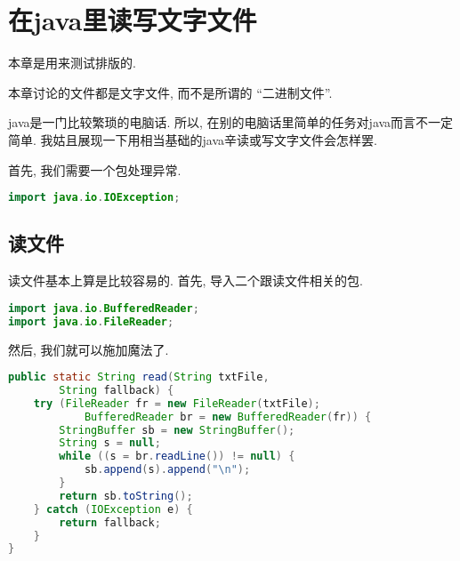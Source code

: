 \chapter{在\texorpdfstring{\gls{java}}{爪哇}里读写文字文件}

\begin{remark*}
    本章是用来测试排版的.
\end{remark*}

\begin{remark*}
    本章讨论的文件都是文字文件,
    而不是所谓的 ``二进制文件''.
\end{remark*}

\gls{java}是一门比较繁琐的电脑话.
所以, 在别的电脑话里简单的任务对\gls{java}而言不一定简单.
我姑且展现一下用相当基础的\gls{java}辛读或写文字文件会怎样罢.

首先, 我们需要一个包处理异常.
\begin{lstlisting}[language=Java]
import java.io.IOException;
\end{lstlisting}

\section{读文件}

读文件基本上算是比较容易的.
首先, 导入二个跟读文件相关的包.
\begin{lstlisting}[language=Java]
import java.io.BufferedReader;
import java.io.FileReader;
\end{lstlisting}

然后, 我们就可以施加魔法了.
\begin{lstlisting}[frame=single,language=Java]
public static String read(String txtFile,
        String fallback) {
    try (FileReader fr = new FileReader(txtFile);
            BufferedReader br = new BufferedReader(fr)) {
        StringBuffer sb = new StringBuffer();
        String s = null;
        while ((s = br.readLine()) != null) {
            sb.append(s).append("\n");
        }
        return sb.toString();
    } catch (IOException e) {
        return fallback;
    }
}
\end{lstlisting}

